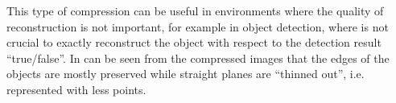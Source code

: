 This type of compression can be useful in environments where the quality of reconstruction is not important, for example in object detection, where is not crucial to exactly reconstruct the object with respect to the detection result ``true/false''. In can be seen from the compressed images that the edges of the objects are mostly preserved while straight planes are ``thinned out'', i.e. represented with less points.